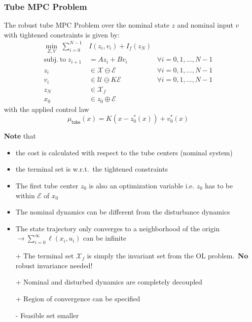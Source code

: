 \subsubsection{Tube MPC Problem}
The robust tube MPC Problem over the nominal state $z$ and nominal input $v$ with tightened constraints is given by:
\begin{align*}
    \min_{Z,V}\;\sum_{i=0}^{N-1} & I(z_{i},v_{i})+I_{f}(z_{N})                                      \\
    \mathrm{subj.~to }\; z_{i+1} & =Az_{i}+Bv_{i}                     & \forall i=0, 1, \ldots, N-1 \\
    z_{i}                        & \in\mathcal{X}\ominus\mathcal{E}   & \forall i=0, 1, \ldots, N-1 \\
    v_i                          & \in\mathcal{U}\ominus K\mathcal{E} & \forall i=0, 1, \ldots, N-1 \\
    z_N                          & \in \mathcal{X}_f                                                \\
    x_0                          & \in z_0 \oplus \mathcal{E}
\end{align*}
with the applied control law
\begin{equation*}
    \mu_{\mathsf{tube}}(x) = K(x - z_0^*(x)) + v_0^*(x)
\end{equation*}

\textbf{Note} that
\begin{itemize}
    \item the cost is calculated with respect to the tube centers (nominal system)
    \item the terminal set is w.r.t.\ the tightened constraints
    \item The first tube center $z_0$ is also an optimization variable i.e. $z_0$ has to be within $\mathcal{E}$ of $x_0$
    \item The nominal dynamics can be different from the disturbance dynamics
    \item The state trajectory only converges to a neighborhood of the origin $\to \sum_{i=0}^\infty \ell(x_i,u_i)$ can be infinite
\end{itemize}

\newpar{}

\begin{itemize}
    \item [+] The terminal set $\mathcal{X}_f$ is simply the invariant set from the OL problem.~\textbf{No} robust invariance needed!
    \item [+] Nominal and disturbed dynamics are completely decoupled
    \item [+] Region of convergence can be specified        %
    \item [-] Feasible set smaller  %
\end{itemize}

